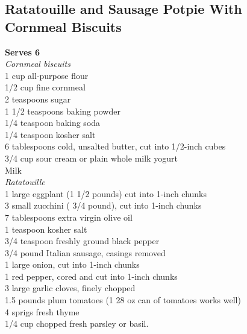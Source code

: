 \documentclass{article}
\numberwithin{figure}{section}
\numberwithin{equation}{section}
\begin{document}
\pagebreak
\subsection{Ratatouille and Sausage Potpie With Cornmeal Biscuits}
{\bf Serves 6}\\

{\it Cornmeal biscuits}\\
1 cup all-purpose flour\\
1/2 cup fine cornmeal\\
2 teaspoons sugar\\
1 1/2 teaspoons baking powder\\
1/4 teaspoon baking soda\\
1/4 teaspoon kosher salt\\
6 tablespoons cold, unsalted butter, cut into 1/2-inch cubes\\
3/4 cup sour cream or plain whole milk yogurt\\
Milk\\

{\it Ratatouille}\\
1 large eggplant (1 1/2 pounds) cut into 1-inch chunks\\
3 small zucchini ( 3/4 pound), cut into 1-inch chunks\\
7 tablespoons extra virgin olive oil\\
1 teaspoon kosher salt\\
3/4 teaspoon freshly ground black pepper\\
3/4 pound Italian sausage, casings removed\\
1 large onion, cut into 1-inch chunks\\
1 red pepper, cored and cut into 1-inch chunks\\
3 large garlic cloves, finely chopped\\
1.5 pounds plum tomatoes (1 28 oz can of tomatoes works well)\\
4 sprigs fresh thyme\\
1/4 cup chopped fresh parsley or basil.\\
\end{document}
